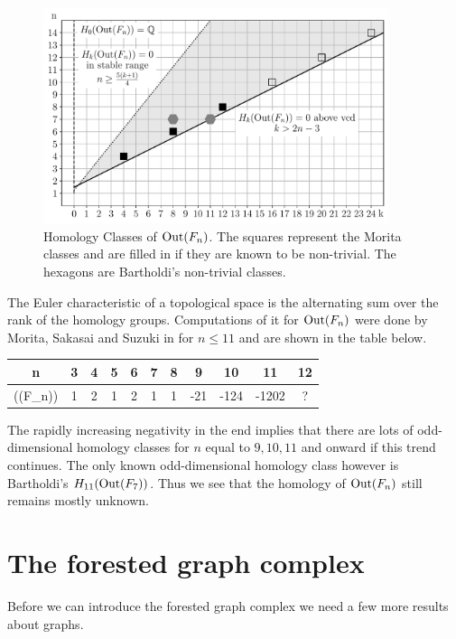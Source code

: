 \begin{figure}[htbp]
	\centering
	\captionsetup{width=0.9\textwidth}
	\includegraphics[width=0.9\textwidth]{./Images/OutFnHomology.pdf}
	\caption{Homology Classes of $\operatorname{Out}(F_{n})$. The squares represent the  Morita classes and are filled in if they are known to be non-trivial.
		The hexagons are Bartholdi's non-trivial classes.}
	\label{fig:homologyOfOutFn}
\end{figure}

The Euler characteristic of a topological space is the alternating sum over the rank of the homology groups.
Computations of it for $\operatorname{Out}(F_{n})$ were done by Morita, Sakasai and Suzuki in \cite{morita15moduli,morita15euler} for $n \leq 11$ and are shown in the table below.

\begin{table}[htpb]
	\centering
	\begin{tabular}{C|C|C|C|C|C|C|C|C|C|C}
		n & 3 & 4 & 5 & 6 & 7 & 8 & 9 & 10 & 11 & 12\\ \hline
		\chi(\out(F_{n})) & 1 & 2 & 1 & 2 & 1 & 1 & -21 & -124 & -1202 & ?
	\end{tabular}
\end{table}

The rapidly increasing negativity in the end implies that there are lots of odd-dimensional homology classes for $n$ equal to  $9,10,11$
and onward if this trend continues.
The only known odd-dimensional homology class however is Bartholdi's $H_{11}(\operatorname{Out}(F_{7}))$.
Thus we see that the homology of $\operatorname{Out}(F_{n})$ still remains mostly unknown.

\section{The forested graph complex}
Before we can introduce the forested graph complex we need a few more results about graphs.

